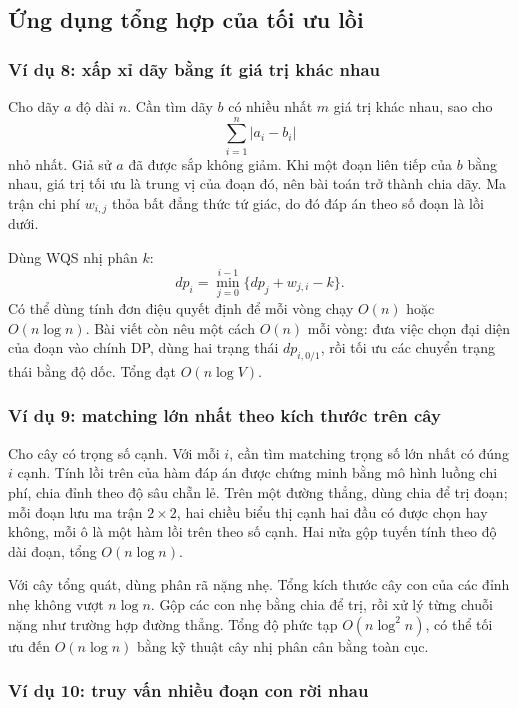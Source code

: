 \documentclass[11pt]{article}
\begin{document}
\subsection{Ứng dụng tổng hợp của tối ưu lồi}

\subsubsection{Ví dụ 8: xấp xỉ dãy bằng ít giá trị khác nhau}

Cho dãy \(a\) độ dài \(n\). Cần tìm dãy \(b\) có nhiều nhất \(m\) giá trị khác
nhau, sao cho
\[
  \sum_{i=1}^n |a_i-b_i|
\]
nhỏ nhất. Giả sử \(a\) đã được sắp không giảm. Khi một đoạn liên tiếp của
\(b\) bằng nhau, giá trị tối ưu là trung vị của đoạn đó, nên bài toán trở
thành chia dãy. Ma trận chi phí \(w_{i,j}\) thỏa bất đẳng thức tứ giác, do đó
đáp án theo số đoạn là lồi dưới.

Dùng WQS nhị phân \(k\):
\[
  dp_i=\min_{j=0}^{i-1}\{dp_j+w_{j,i}-k\}.
\]
Có thể dùng tính đơn điệu quyết định để mỗi vòng chạy \(O(n)\) hoặc
\(O(n\log n)\). Bài viết còn nêu một cách \(O(n)\) mỗi vòng: đưa việc chọn đại
diện của đoạn vào chính DP, dùng hai trạng thái \(dp_{i,0/1}\), rồi tối ưu các
chuyển trạng thái bằng độ dốc. Tổng đạt \(O(n\log V)\).

\subsubsection{Ví dụ 9: matching lớn nhất theo kích thước trên cây}

Cho cây có trọng số cạnh. Với mỗi \(i\), cần tìm matching trọng số lớn nhất có
đúng \(i\) cạnh. Tính lồi trên của hàm đáp án được chứng minh bằng mô hình
luồng chi phí, chia đỉnh theo độ sâu chẵn lẻ. Trên một đường thẳng, dùng chia
để trị đoạn; mỗi đoạn lưu ma trận \(2\times2\), hai chiều biểu thị cạnh hai
đầu có được chọn hay không, mỗi ô là một hàm lồi trên theo số cạnh. Hai nửa
gộp tuyến tính theo độ dài đoạn, tổng \(O(n\log n)\).

Với cây tổng quát, dùng phân rã nặng nhẹ. Tổng kích thước cây con của các đỉnh
nhẹ không vượt \(n\log n\). Gộp các con nhẹ bằng chia để trị, rồi xử lý từng
chuỗi nặng như trường hợp đường thẳng. Tổng độ phức tạp \(O(n\log^2 n)\), có
thể tối ưu đến \(O(n\log n)\) bằng kỹ thuật cây nhị phân cân bằng toàn cục.

\subsubsection{Ví dụ 10: truy vấn nhiều đoạn con rời nhau}
\end{document}
